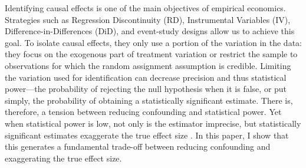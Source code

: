 			Identifying causal effects is one of the main objectives of empirical economics. Strategies such as Regression Discontinuity (RD), Instrumental Variables (IV), Difference-in-Differences (DiD), and event-study designs allow us to achieve this goal. To isolate causal effects, they only use a portion of the variation in the data: they focus on the exogenous part of treatment variation or restrict the sample to observations for which the random assignment assumption is credible. Limiting the variation used for identification can decrease precision and thus statistical power---the probability of rejecting the null hypothesis when it is false, or put simply, the probability of obtaining a statistically significant estimate. There is, therefore, a tension between reducing confounding and statistical power. Yet when statistical power is low, not only is the estimator imprecise, but statistically significant estimates exaggerate the true effect size \citep{gelmanType2000, ioannidis_why_2008, gelman_beyond_2014}. In this paper, I show that this generates a fundamental trade-off between reducing confounding and exaggerating the true effect size. %
			
